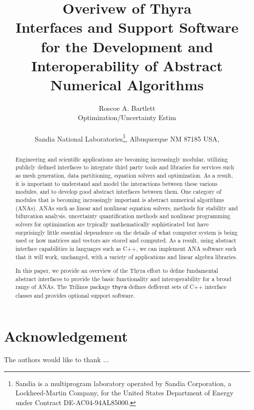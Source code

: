 \documentclass[pdf,ps2pdf,11pt]{SANDreport}
\title{\center
Overivew of Thyra\\[2ex] Interfaces and Support Software for the Development
and Interoperability of Abstract Numerical Algorithms}
\author{
Roscoe A. Bartlett \\ Optimization/Uncertainty Estim \\ \\ Sandia National
Laboratories\footnote{ Sandia is a multiprogram laboratory operated by Sandia
Corporation, a Lockheed-Martin Company, for the United States Department of
Energy under Contract DE-AC04-94AL85000.}, Albuquerque NM 87185 USA, \\ }
\date{}
\begin{document}
\maketitle

%

%
\begin{abstract}
%
Engineering and scientific applications are becoming increasingly modular,
utilizing publicly defined interfaces to integrate third party tools and
libraries for services such as mesh generation, data partitioning, equation
solvers and optimization.  As a result, it is important to understand and
model the interactions between these various modules, and to develop good
abstract interfaces between them.  One category of modules that is becoming
increasingly important is abstract numerical algorithms (ANAs).  ANAs such as
linear and nonlinear equation solvers, methods for stability and bifurcation
analysis, uncertainty quantification methods and nonlinear programming solvers
for optimization are typically mathematically sophisticated but have
surprisingly little essential dependence on the details of what computer
system is being used or how matrices and vectors are stored and computed.  As
a result, using abstract interface capabilities in languages such as C++, we
can implement ANA software such that it will work, unchanged, with a variety
of applications and linear algebra libraries.

In this paper, we provide an overview of the Thyra effort to define
fundamental abstract interfaces to provide the basic functionality and
interoperability for a broud range of ANAs.  The Trilinos package
{}\texttt{thyra} defines defferent sets of C++ interface classes and provides
optional support software.
%
\end{abstract}
%

%
\clearpage
\section*{Acknowledgement}
The authors would like to thank ...
\end{document}

